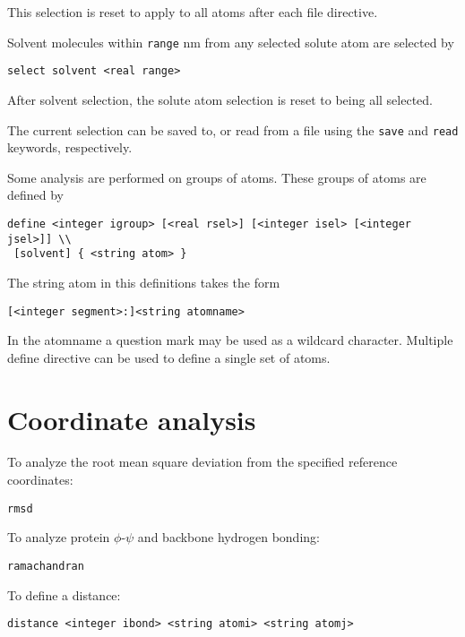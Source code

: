 This selection is reset to apply to all atoms after each file
directive.

Solvent molecules within \verb+range+ nm from any selected solute atom
are selected by

\begin{verbatim}
select solvent <real range>
\end{verbatim}

After solvent selection, the solute atom selection is reset to being all
selected.

The current selection can be saved to, or read from a file using the 
\verb+save+ and \verb+read+ keywords, respectively.

\par

Some analysis are performed on groups of atoms. These groups of atoms
are defined by

\begin{verbatim}
define <integer igroup> [<real rsel>] [<integer isel> [<integer jsel>]] \\
 [solvent] { <string atom> }
\end{verbatim}

The string atom in this definitions takes the form

\begin{verbatim}
[<integer segment>:]<string atomname>
\end{verbatim}

In the atomname a question mark may be used as a wildcard character. Multiple
define directive can be used to define a single set of atoms.

\section{Coordinate analysis}

To analyze the root mean square deviation from the specified reference
coordinates:

\begin{verbatim}
rmsd
\end{verbatim}

To analyze protein $\phi$-$\psi$ and backbone hydrogen bonding:

\begin{verbatim}
ramachandran
\end{verbatim}

To define a distance:

\begin{verbatim}
distance <integer ibond> <string atomi> <string atomj> 
\end{verbatim}

